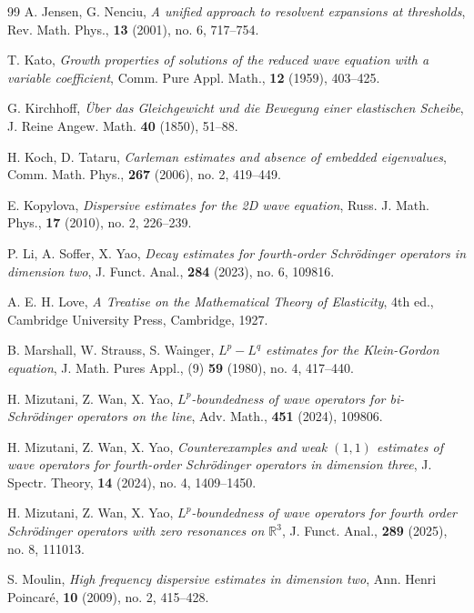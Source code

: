 \documentclass[reqno]{amsart}
\newcommand\R{\mathbb{R}}
\numberwithin{equation}{section}
\begin{document}
\begin{thebibliography}{99}
A. Jensen, G. Nenciu, \emph{A unified approach to resolvent expansions at thresholds}, Rev. Math. Phys., \textbf{13} (2001), no. 6, 717--754.

T. Kato, \emph{Growth properties of solutions of the reduced wave equation
 with a variable coefficient}, Comm. Pure Appl. Math., \textbf{12} (1959), 403--425.

G. Kirchhoff, \emph{\"Uber das Gleichgewicht und die Bewegung einer elastischen Scheibe},
J. Reine Angew. Math. \textbf{40} (1850), 51--88.

H. Koch,  D. Tataru, \emph{Carleman estimates and absence of embedded eigenvalues}, Comm. Math. Phys., \textbf{267} (2006), no. 2, 419--449.

E. Kopylova, \emph{Dispersive estimates for the 2D wave equation}, Russ. J. Math. Phys.,
\textbf{17} (2010), no. 2, 226--239.

P. Li, A. Soffer,  X. Yao,
\emph{Decay estimates for fourth-order Schr\"odinger operators in dimension two},
J. Funct. Anal., \textbf{284} (2023), no. 6, 109816.

A. E. H. Love, \emph{A Treatise on the Mathematical Theory of Elasticity},
4th ed., Cambridge University Press, Cambridge, 1927.




B. Marshall, W. Strauss, S. Wainger,
 \emph{$L^p-L^q$ estimates for the Klein-Gordon equation}, J. Math. Pures Appl., (9) \textbf{59} (1980), no. 4, 417--440.



H. Mizutani, Z. Wan, X. Yao,
 \emph{$L^p$-boundedness of wave operators for bi-Schr\"{o}dinger operators on the line},
Adv. Math., \textbf{451} (2024), 109806.

H. Mizutani, Z. Wan, X. Yao,
\emph{Counterexamples and weak $(1,1)$ estimates of wave operators for fourth-order Schr\"odinger operators in dimension three}, J. Spectr. Theory, \textbf{14} (2024), no. 4, 1409--1450.


 H. Mizutani, Z. Wan, X. Yao, \emph{$L^p$-boundedness of wave operators for fourth order Schr\"odinger operators with zero resonances on $\R^3$}, J.  Funct. Anal., \textbf{289} (2025), no. 8, 111013.

S. Moulin,
 \emph{High frequency dispersive estimates in dimension two}, Ann. Henri Poincar\'{e},
 \textbf{10} (2009), no. 2, 415--428.


\end{thebibliography}
\end{document}
